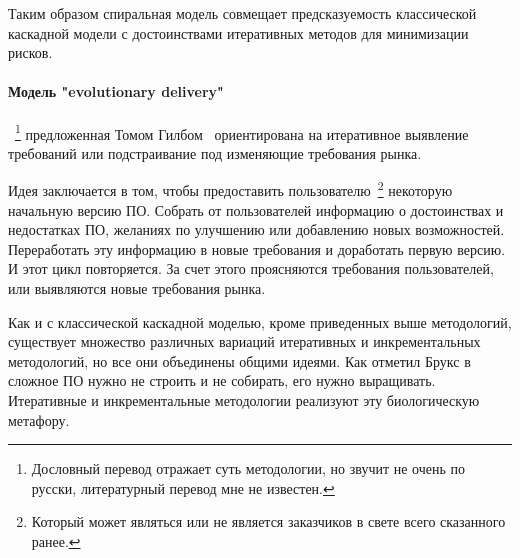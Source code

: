 Таким образом спиральная модель совмещает предсказуемость классической каскадной модели с достоинствами итеративных методов для минимизации рисков.

\paragraph{Модель "evolutionary delivery"}~\footnote{Дословный перевод отражает суть методологии, но звучит не очень по русски, литературный перевод мне не известен.} предложенная Томом Гилбом~\cite{Gilb:1985:EDV} ориентирована на итеративное выявление требований или подстраивание под изменяющие требования рынка.

Идея заключается в том, чтобы предоставить пользователю~\footnote{Который может являться или не является заказчиков в свете всего сказанного ранее.} некоторую начальную версию ПО. Собрать от пользователей информацию о достоинствах и недостатках ПО, желаниях по улучшению или добавлению новых возможностей. Переработать эту информацию в новые требования и доработать первую версию. И этот цикл повторяется. За счет этого проясняются требования пользователей, или выявляются новые требования рынка.

Как и с классической каскадной моделью, кроме приведенных выше методологий, существует множество различных вариаций итеративных и инкрементальных методологий, но все они объединены общими идеями. Как отметил Брукс в~\cite{Brooks:1987:NSB} сложное ПО нужно не строить и не собирать, его нужно выращивать. Итеративные и инкрементальные методологии реализуют эту биологическую метафору.

